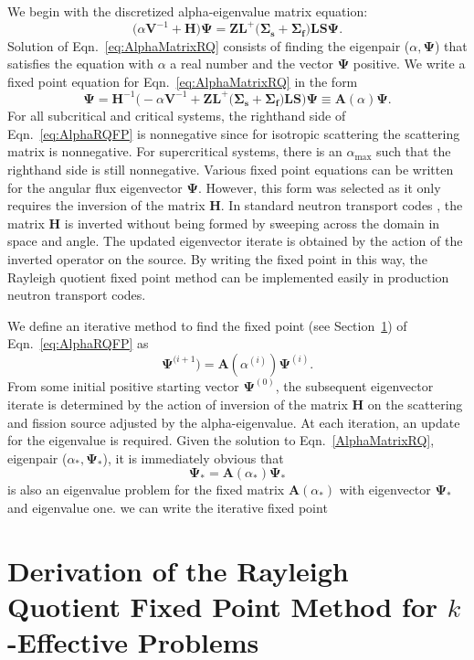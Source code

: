 We begin with the discretized alpha-eigenvalue matrix equation:
\begin{equation}
	\big ( \alpha \mathbf{V}^{-1} + \mathbf{H} \big ) \mathbf{\Psi} = \mathbf{Z} \mathbf{L}^{+} \big ( \mathbf{\Sigma_{s}} + \mathbf{\Sigma_{f}} \big ) \mathbf{L} \mathbf{S} \mathbf{\Psi}.
	\label{eq:AlphaMatrixRQ}
\end{equation}
Solution of Eqn.~\ref{eq:AlphaMatrixRQ} consists of finding the eigenpair ($\alpha,\mathbf{\Psi}$) that satisfies the equation with $\alpha$ a real number and the vector $\mathbf{\Psi}$ positive. We write a fixed point equation for Eqn.~\ref{eq:AlphaMatrixRQ} in the form
\begin{equation}
	\mathbf{\Psi} = \mathbf{H}^{-1} \big ( -\alpha \mathbf{V}^{-1} + \mathbf{Z} \mathbf{L}^{+} \big ( \mathbf{\Sigma_{s}} + \mathbf{\Sigma_{f}} \big ) \mathbf{L} \mathbf{S} \big ) \mathbf{\Psi} \equiv \mathbf{A}(\alpha) \mathbf{\Psi}.
	\label{eq:AlphaRQFP}
\end{equation}
For all subcritical and critical systems, the righthand side of Eqn.~\ref{eq:AlphaRQFP} is nonnegative since for isotropic scattering the scattering matrix is nonnegative. For supercritical systems, there is an $\alpha_{\text{max}}$ such that the righthand side is still nonnegative. Various fixed point equations can be written for the angular flux eigenvector $\mathbf{\Psi}$. However, this form was selected as it only requires the inversion of the matrix $\mathbf{H}$. In standard neutron transport codes \cite{hanebutte_ardra_1999} \cite{alcouffe2005partisn}, the matrix $\mathbf{H}$ is inverted without being formed by sweeping across the domain in space and angle. The updated eigenvector iterate is obtained by the action of the inverted operator on the source. By writing the fixed point in this way, the Rayleigh quotient fixed point method can be implemented easily in production neutron transport codes.

We define an iterative method to find the fixed point (see Section~\ref{}) of Eqn.~\ref{eq:AlphaRQFP} as
\begin{equation}
	\mathbf{\Psi}^{(i+1}) = \mathbf{A}(\alpha^{(i)}) \mathbf{\Psi}^{(i)}.
\end{equation}
From some initial positive starting vector $\mathbf{\Psi}^{(0)}$, the subsequent eigenvector iterate is determined by the action of inversion of the matrix $\mathbf{H}$ on the scattering and fission source adjusted by the alpha-eigenvalue. At each iteration, an update for the eigenvalue is required. Given the solution to Eqn.~\ref{AlphaMatrixRQ}, eigenpair ($\alpha_{*}, \mathbf{\Psi}_{*}$), it is immediately obvious that
\begin{equation}
	\mathbf{\Psi}_{*} =  \mathbf{A}(\alpha_{*}) \mathbf{\Psi}_{*}
\end{equation}
is also an eigenvalue problem for the fixed matrix $\mathbf{A}(\alpha_{*})$ with eigenvector $\mathbf{\Psi}_{*}$ and eigenvalue one.
we can write the iterative fixed point 

\section{Derivation of the Rayleigh Quotient Fixed Point Method for $k$-Effective Problems}